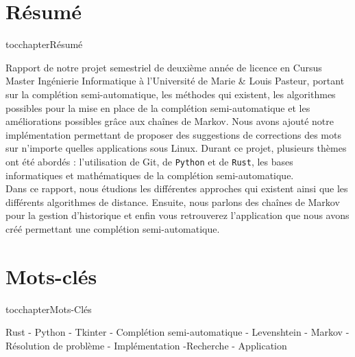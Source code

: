 \documentclass[a4paper, 11pt]{report}
\newcommand{\langage}[1]{\texttt{#1}}
\begin{document}
{%
\newpage
\pagestyle{plain}
\begin{center}
	\vspace*{\fill} %
	\section*{Résumé}
	\addcontentsline
	{toc}{chapter}{Résumé}
	\begin{justify}
		Rapport de notre projet semestriel de deuxième année de licence en Cursus Master Ingénierie Informatique à l’Université de Marie \& Louis Pasteur, portant sur la complétion semi-automatique, les méthodes qui existent, les algorithmes possibles pour la mise en place de la complétion semi-automatique et les améliorations possibles grâce aux chaînes de Markov. Nous avons ajouté notre implémentation permettant de proposer des suggestions de corrections des mots sur n'importe quelles applications sous Linux. Durant ce projet, plusieurs thèmes ont été abordés : l'utilisation de Git, de \langage{Python} et de \langage{Rust}, les bases informatiques et mathématiques de la complétion semi-automatique.\\
		Dans ce rapport, nous étudions les différentes approches qui existent ainsi que  les différents algorithmes de distance. Ensuite, nous parlons  des chaînes de Markov pour la gestion d'historique et enfin vous retrouverez l'application que nous avons créé permettant une complétion semi-automatique.

	\end{justify}
	\vspace*{\fill} %

	\section*{Mots-clés}
	\addcontentsline
	{toc}{chapter}{Mots-Clés}
	\begin{justify}
		\centering
		Rust - Python - Tkinter - Complétion semi-automatique - Levenshtein - Markov - Résolution de problème - Implémentation -Recherche - Application
	\end{justify}
	\vspace*{\fill} %


\end{center}}
\end{document}
